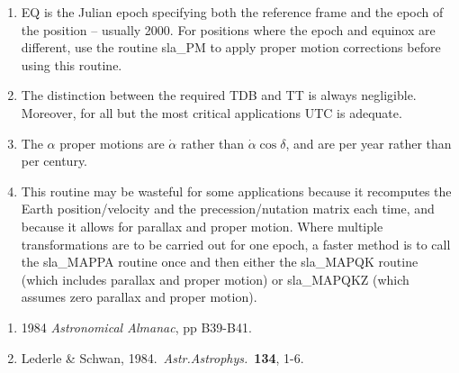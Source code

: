 {
}
\notes
{
 \begin{enumerate}
  \item EQ is the Julian epoch specifying both the reference
        frame and the epoch of the position -- usually 2000.
        For positions where the epoch and equinox are
        different, use the routine sla\_PM to apply proper
        motion corrections before using this routine.
  \item The distinction between the required TDB and TT is
        always negligible.  Moreover, for all but the most
        critical applications UTC is adequate.
  \item The $\alpha$ proper motions are $\dot{\alpha}$ rather than
        $\dot{\alpha}\cos\delta$, and are per year rather than per century.
  \item This routine may be wasteful for some applications
        because it recomputes the Earth position/velocity and
        the precession/nutation matrix each time, and because
        it allows for parallax and proper motion.  Where
        multiple transformations are to be carried out for one
        epoch, a faster method is to call the sla\_MAPPA routine
        once and then either the sla\_MAPQK routine (which includes
        parallax and proper motion) or sla\_MAPQKZ (which assumes
        zero parallax and proper motion).
 \end{enumerate}
}
{
 \begin{enumerate}
  \item 1984 {\it Astronomical Almanac}, pp B39-B41.
  \item Lederle \& Schwan, 1984.\ {\it Astr.Astrophys.}\ {\bf 134}, 1-6.
 \end{enumerate}
}
{
}
{
  \\
}

